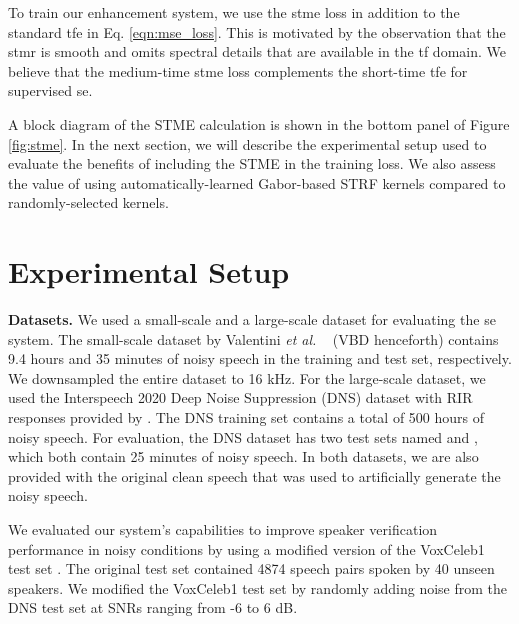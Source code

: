 \documentclass{article}
\newcommand{\etal}{\emph{et al.} }
\newcommand{\fref}[1]{Figure \ref{#1}}		\newcommand{\eref}[1]{Eq. \eqref{#1}}
\begin{document}
To train our enhancement system, we use the \gls{stme} loss in addition to the standard \gls{tfe} in \eref{eqn:mse_loss}. This is motivated by the observation that the \gls{stmr} is smooth and omits spectral details that are available in the \gls{tf} domain. We believe that the medium-time \gls{stme} loss complements the short-time \gls{tfe} for supervised \gls{se}.















A block diagram of the STME calculation is shown in the bottom panel of \fref{fig:stme}.  In the next section, we will describe the experimental setup used to evaluate the benefits of including the STME in the training loss.  We also assess the value of using automatically-learned Gabor-based STRF kernels compared to randomly-selected kernels.   

\section{Experimental Setup}

\textbf{Datasets.}
We used a small-scale and a large-scale dataset for evaluating the \gls{se} system. The small-scale dataset by Valentini \etal~\cite{valentini2016investigating} (VBD henceforth) contains 9.4 hours and 35 minutes of noisy speech in the training and test set, respectively. We downsampled the entire dataset to 16 kHz.  For the large-scale dataset, we used the Interspeech 2020 Deep Noise Suppression (DNS) dataset \cite{reddyINTERSPEECH2020Deep2020} with RIR responses provided by \cite{reddy2020icassp}.  
The DNS training set contains a total of 500 hours of noisy speech.  
For evaluation, the DNS dataset has two test sets named  and , which both contain 25 minutes of noisy speech.  In both datasets, we are also provided with the original clean speech that was used to artificially generate the noisy speech.  

We evaluated our system's capabilities to improve speaker verification performance in noisy conditions by using a modified version of the VoxCeleb1 test set \cite{nagraniVoxCelebLargeScaleSpeaker2017}.  The original test set contained 4874 speech pairs spoken by 40 unseen speakers.  We modified the VoxCeleb1 test set by randomly adding noise from the DNS test set at SNRs ranging from -6 to 6 dB.
\end{document}

